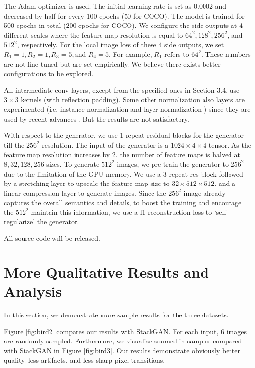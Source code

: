 \documentclass[10pt, letterpaper]{article}
\begin{document}
The Adam optimizer \cite{kingma2014adam} is used.  The initial learning rate is set as 0.0002 and decreased by half for every 100 epochs (50 for COCO). The model is trained for 500 epochs in total (200 epochs for COCO).
We configure the side outputs at 4 different scales where the feature map resolution is equal to $64^2,128^2,256^2$, and $512^2$, respectively.
For the local image loss of these 4 side outputs, we set $R_1=1, R_2=1, R_3=5, \text{and } R_4=5$. For example, $R_1$ refers to $64^2$. These numbers are not fine-tuned but are set empirically. We believe there exists better configurations to be explored.

All intermediate conv layers, except from the specified ones in Section 3.4, use $3{\times}3$ kernels (with reflection padding).
Some other normalization also layers are experimented (i.e. instance normalization \cite{ulyanov2016instance} and layer normalization \cite{ba2016layer}) since they are used by recent advances \cite{zhu2017unpaired,chen2017photographic}. But the results are not satisfactory. 

With respect to the generator, we use 1-repeat residual blocks for the generator till the $256^2$ resolution. The input of the generator is a $1024{\times}4{\times}4$ tensor.  As the feature map resolution increases by 2, the number of feature maps is halved at $8, 32, 128, 256$ sizes. 
To generate $512^2$ images, we pre-train the generator to $256^2$ due to the limitation of the GPU memory. We use a $3$-repeat res-block followed by a stretching layer to upscale the feature map size to $32{\times}512{\times}512$. and a linear compression layer to generate images. 
Since the $256^2$ image already captures the overall semantics and details, to boost the training and encourage the $512^2$ maintain this information, we use a l1 reconstruction loss to `self-regularize' the generator. %

All source code will be released. %

\section{More Qualitative Results and Analysis}
In this section, we demonstrate more sample results for the three datasets.

Figure \ref{fig:bird2} compares our results with StackGAN. For each input, 6 images are randomly sampled. Furthermore, we visualize zoomed-in samples compared with StackGAN in Figure \ref{fig:bird3}. Our results demonstrate obviously better quality, less artifacts, and less sharp pixel transitions.
\end{document}
